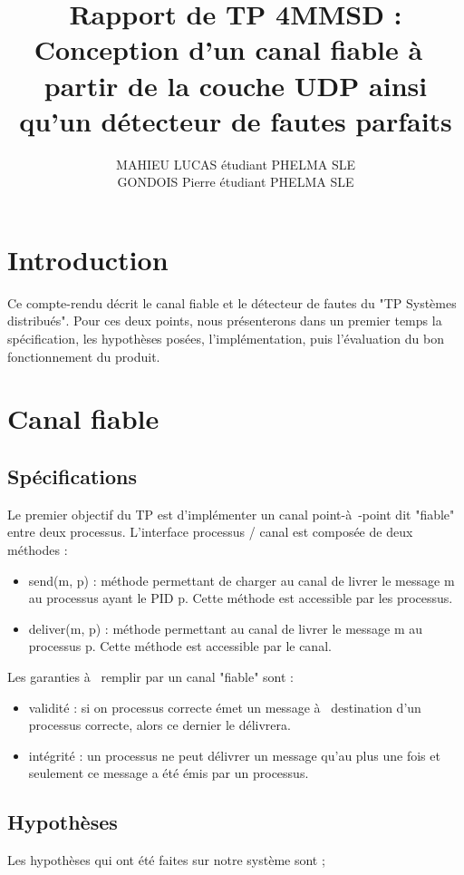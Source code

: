 \documentclass[a4paper, 10pt, french]{article}
\title{Rapport de TP 4MMSD : Conception d'un canal fiable à  partir de la couche UDP ainsi qu'un détecteur de fautes parfaits}
\author{ MAHIEU LUCAS étudiant PHELMA SLE 
\\ GONDOIS Pierre étudiant PHELMA SLE
}
\begin{document}
\maketitle

\section{Introduction}
Ce compte-rendu décrit le canal fiable et le détecteur de fautes du "TP Systèmes distribués". Pour ces deux points, nous présenterons dans un premier temps la spécification, les hypothèses posées, l'implémentation, puis l'évaluation du bon fonctionnement du produit.

\section{Canal fiable}

\subsection{Spécifications}
Le premier objectif du TP est d'implémenter un canal point-à -point dit "fiable" entre deux processus. L'interface processus / canal est composée de deux méthodes :

\begin{itemize}
	\item send(m, p) : méthode permettant de charger au canal de livrer le message m au processus ayant le PID p. Cette méthode est accessible par les processus.
	\item deliver(m, p) : méthode permettant au canal de livrer le message m au processus p. Cette méthode est accessible par le canal.\newline
\end{itemize}
	
	Les garanties à  remplir par un canal "fiable" sont :
\begin{itemize}
	\item validité : si on processus correcte émet un message à  destination d'un processus correcte, alors ce dernier le délivrera.
	\item intégrité : un processus ne peut délivrer un message qu'au plus une fois et seulement ce message a été émis par un processus.
\end{itemize}

\subsection{Hypothèses}
Les hypothèses qui ont été faites sur notre système sont ; 
\end{document}
